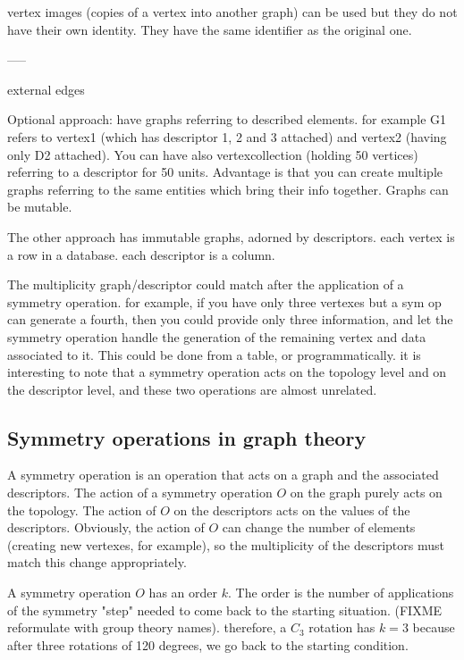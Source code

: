 vertex images (copies of a vertex into another graph) can be used but they
do not have their own identity. They have the same identifier as the
original one.

-----

external edges 



Optional approach:
have graphs referring to described elements. for example G1 refers to
vertex1 (which has descriptor 1, 2 and 3 attached) and vertex2 (having only
D2 attached). You can have also vertexcollection (holding 50 vertices)
referring to a descriptor for 50 units. Advantage is that you can create
multiple graphs referring to the same entities which bring their info
together. Graphs can be mutable.

The other approach has immutable graphs, adorned by descriptors.
each vertex is a row in a database. each descriptor is a column.

The multiplicity graph/descriptor could match after the application of a symmetry operation.
for example, if you have only three vertexes but a sym op can generate a
fourth, then you could provide only three information, and let the symmetry
operation handle the generation of the remaining vertex and data associated
to it. This could be done from a table, or programmatically. it is
interesting to note that a symmetry operation acts on the topology level and
on the descriptor level, and these two operations are almost unrelated.

\subsection{Symmetry operations in graph theory}

A symmetry operation is an operation that acts on a graph and the associated
descriptors. The action of a symmetry operation $O$ on the graph purely acts on
the topology. The action of $O$ on the descriptors acts on the values of the
descriptors. Obviously, the action of $O$ can change the number of elements
(creating new vertexes, for example), so the multiplicity of the descriptors
must match this change appropriately.

A symmetry operation $O$ has an order $k$. The order is the number of
applications of the symmetry "step" needed to come back to the starting
situation. (FIXME reformulate with group theory names). therefore, a $C_3$
rotation has $k=3$ because after three rotations of 120 degrees, we go back
to the starting condition.

